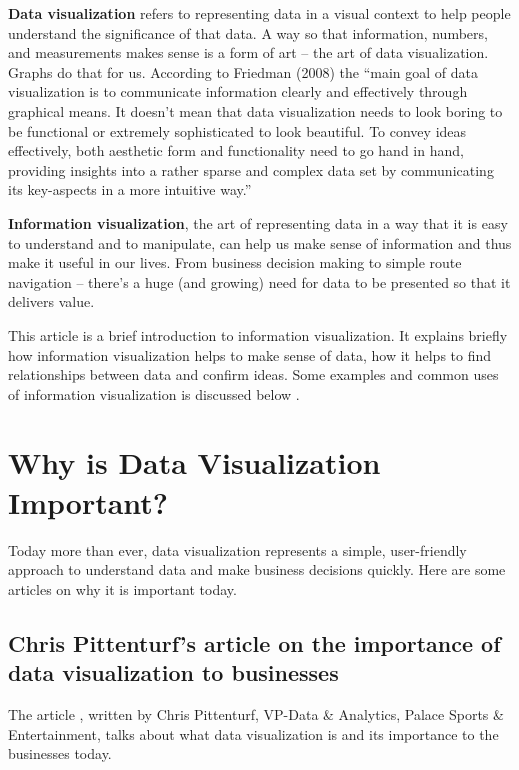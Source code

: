 \documentclass[]{book}
\theoremstyle{definition}
\theoremstyle{definition}
\theoremstyle{definition}
\theoremstyle{remark}
\begin{document}
\textbf{Data visualization} refers to representing data in a visual
context to help people understand the significance of that data. A way
so that information, numbers, and measurements makes sense is a form of
art -- the art of data visualization. Graphs do that for us. According
to Friedman (2008) \citep{viz} the ``main goal of data visualization is
to communicate information clearly and effectively through graphical
means. It doesn't mean that data visualization needs to look boring to
be functional or extremely sophisticated to look beautiful. To convey
ideas effectively, both aesthetic form and functionality need to go hand
in hand, providing insights into a rather sparse and complex data set by
communicating its key-aspects in a more intuitive way.''

\textbf{Information visualization}, the art of representing data in a
way that it is easy to understand and to manipulate, can help us make
sense of information and thus make it useful in our lives. From business
decision making to simple route navigation -- there's a huge (and
growing) need for data to be presented so that it delivers value.

This article is a brief introduction to information visualization. It
explains briefly how information visualization helps to make sense of
data, how it helps to find relationships between data and confirm ideas.
Some examples and common uses of information visualization is discussed
below \citep{info_viz}.

\section{Why is Data Visualization
Important?}\label{why-is-data-visualization-important}

Today more than ever, data visualization represents a simple,
user-friendly approach to understand data and make business decisions
quickly. Here are some articles on why it is important today.

\subsection{Chris Pittenturf's article on the importance of data
visualization to
businesses}\label{chris-pittenturfs-article-on-the-importance-of-data-visualization-to-businesses}

The article \citep{viz_importance}, written by Chris Pittenturf, VP-Data
\& Analytics, Palace Sports \& Entertainment, talks about what data
visualization is and its importance to the businesses today.
\end{document}
